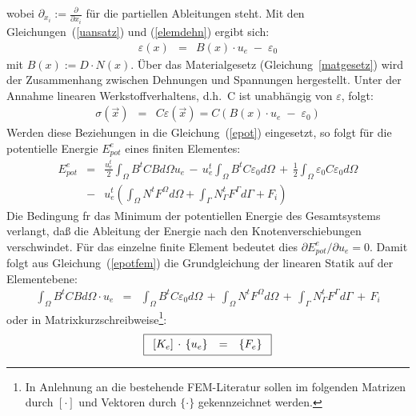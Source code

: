 wobei $\partial_{x_{i}} := \frac{\partial}{\partial x_{i}}$ für die
partiellen Ableitungen steht. Mit den Gleichungen~(\ref{uansatz}) und
(\ref{elemdehn}) ergibt sich:
\begin{eqnarray}
\label{dehnversch}
 \varepsilon(x) & = & B(x) \cdot u_{e} \; - \; \varepsilon_{0}
\end{eqnarray}
mit  $B(x) := D \cdot N(x)$. Über das Materialgesetz
(Gleichung~\ref{matgesetz})
wird der Zusammenhang zwischen Dehnungen und Spannungen hergestellt.
Unter der Annahme linearen Werkstoffverhaltens, d.h.\ C ist unabhängig
von $\varepsilon$, folgt:
\begin{eqnarray}
\label{sigmaelem}
 \sigma(\vec x) & = & C \varepsilon(\vec x)
                  = C \left( B(x) \cdot u_{e} \; - \; \varepsilon_{0} \right)
\end{eqnarray}
Werden diese Beziehungen in die Gleichung~(\ref{epot}) eingesetzt, so folgt
für die potentielle Energie $E_{pot}^{e}$ eines finiten Elementes:
\begin{eqnarray}
\label{epotfem}
  E_{pot}^{e} & = &
  \frac{u_{e}^{t}}{2} \int_{\Omega} B^{t} C B d\Omega u_{e} \, - \,
  u_{e}^{t} \int_{\Omega} B^{t} C \varepsilon_{0} d\Omega \, + \,
  \frac{1}{2} \int_{\Omega} \varepsilon_{0} C \varepsilon_{0} d\Omega
  \nonumber \\
  & - & u_{e}^{t} \left( \int_{\Omega} N^{t} F^{\Omega} d\Omega
	+ \int_{\Gamma} N^{t}_{\Gamma} F^{\Gamma} d\Gamma + F_{i} \right)
\end{eqnarray}
Die Bedingung fr das Minimum der potentiellen Energie des Gesamtsystems
verlangt, daß die Ableitung der Energie nach den Knotenverschiebungen
verschwindet. Für das einzelne finite Element bedeutet dies
$\partial E_{pot}^{e} / \partial u_{e} = 0$. Damit folgt aus
Gleichung~(\ref{epotfem}) die Grundgleichung der linearen Statik auf
der Elementebene:
\begin{eqnarray}
\label{intstatik}
  \int_{\Omega} B^{t} C B d\Omega \cdot u_{e}
  & = &
  \int_{\Omega} B^{t} C \varepsilon_{0} d\Omega \, + \,
  \int_{\Omega} N^{t} F^{\Omega} d\Omega \, + \,
  \int_{\Gamma} N^{t}_{\Gamma} F^{\Gamma} d\Gamma \, + \, F_{i}
\end{eqnarray}
oder in Matrixkurzschreibweise\footnote{In Anlehnung an die bestehende
FEM-Literatur \cite{Koh92} sollen im folgenden Matrizen durch $[\cdot]$ und
Vektoren durch $\{ \cdot \}$ gekennzeichnet werden.}:
\begin{equation}
\label{linstatik}
\fbox{$
 \displaystyle
 \begin{array}{rcl}
  [K_{e}] \, \cdot \, \{u_{e}\} & = & \{F_{e}\}
 \end{array}
 $}
\end{equation}
